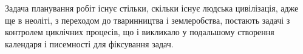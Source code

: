 Задача планування робіт існує стільки, скільки існує людська цивілізація, адже ще в неоліті, з переходом до тваринництва і землеробства, постають задачі з контролем циклічних процесів, що і викликало у подальшому створення календаря і писемності для фіксування задач.
